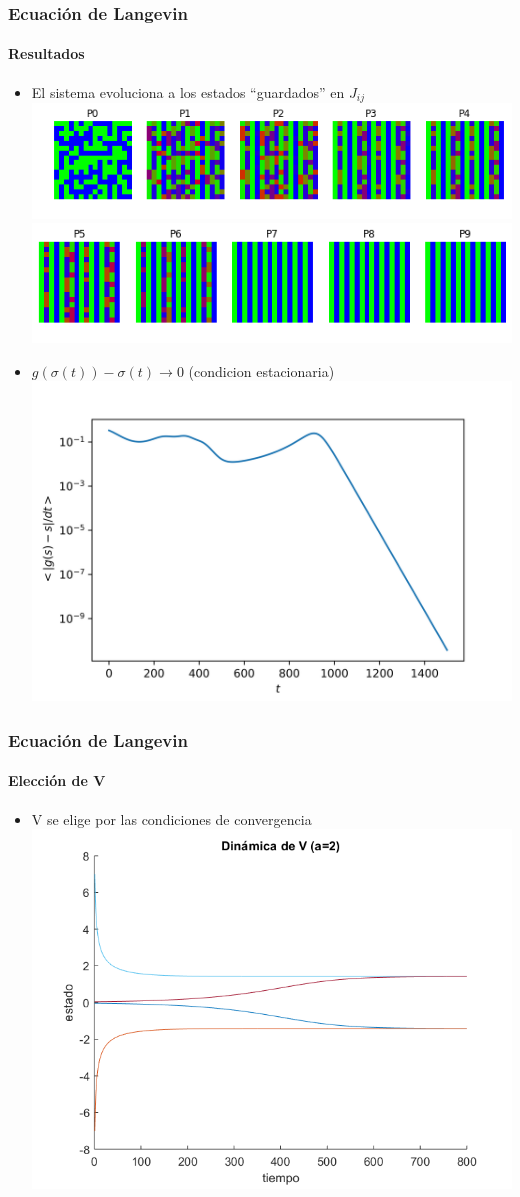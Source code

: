 \documentclass[11pt]{beamer}
\begin{document}
\begin{frame}
\frametitle{Ecuación de Langevin}
\framesubtitle{Resultados}
\begin{itemize}
	\item El sistema evoluciona a los estados ``guardados'' en  $J_{ij}$\\
	\centering
	\includegraphics[width=0.75\linewidth]{evolucion_langevin-0.png}
	\includegraphics[width=0.75\linewidth]{evolucion_langevin-1.png}
	\item  $g(\sigma(t)) - \sigma(t) \rightarrow 0$ (condicion estacionaria)
	\centering
	\includegraphics[width=0.45\linewidth]{convergencia_langevin.png}
\end{itemize}
\end{frame}
\begin{frame}
\frametitle{Ecuación de Langevin}
\framesubtitle{Elección de V}
\begin{itemize}
	\item V se elige por las condiciones de convergencia
	\includegraphics[scale=0.5]{potencial}
\end{itemize}
\end{frame}
\end{document}
